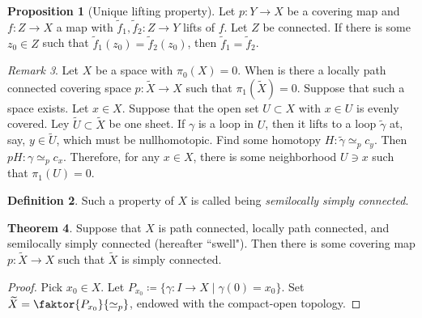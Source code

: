\documentclass[10pt,letterpaper,cm]{nupset}
\theoremstyle{definition}
\newtheorem{definition}{Definition}[subsection]
\theoremstyle{theorem}
\newtheorem{theorem}[definition]{Theorem}
\newtheorem{prop}[definition]{Proposition}
\theoremstyle{remark}
\newtheorem{remark}[definition]{Remark}
\newcommand{\1}{\mathbb{1}}
\newcommand{\0}{\vec 0}
\begin{document}
\begin{prop}[Unique lifting property]
Let $p: Y \to X$ be a covering map and $f: Z \to X$ a map with $\tilde{f}_1, \tilde{f}_2 : Z \to Y$ lifts of $f$. Let $Z$ be connected. If there is some $z_0 \in Z$ such that $\tilde{f}_1(z_0) = \tilde{f}_2(z_0)$, then $\tilde{f}_1 =  \tilde{f}_2$.
\end{prop}

\begin{remark}
Let $X$ be a space with  $\pi_0(X) =0$. When is there a locally path connected covering space $p: \widetilde{X} \to X$ such that $\pi_1(\widetilde{X}) =0$. Suppose that such a space exists. Let $x \in X$. Suppose that the open set $U \subset X$ with $x\in U$ is evenly covered. Ley $\widetilde{U} \subset \widetilde{X}$ be one sheet.  If $\gamma$ is a loop in $U$, then it lifts to a loop $\tilde{\gamma}$ at, say, $y \in \widetilde{U}$, which must be nullhomotopic. Find some homotopy $H: \tilde{\gamma} \simeq_p c_y$. Then $pH : \gamma \simeq_p c_x$. Therefore, for any $x\in X$, there is some neighborhood $U\ni x$ such that $\pi_1(U) =0$.
\begin{definition}
Such a property of $X$ is called being \textit{semilocally simply connected}. 
\end{definition}
\end{remark}

\begin{theorem}
Suppose that $X$ is path connected, locally path connected, and semilocally simply connected (hereafter ``swell"). Then there is some covering map $p: \widetilde{X} \to X$ such that $\widetilde{X}$ is simply connected. 
\end{theorem}
\begin{proof}
Pick $x_0 \in X$. Let $P_{x_0} \coloneqq  \{\gamma : I \to X \mid \gamma(0) = x_0\}$. Set $\widetilde{X} = \faktor{P_{x_0}}{\simeq_p}$, endowed with the compact-open topology. 
\end{proof}
\end{document}
